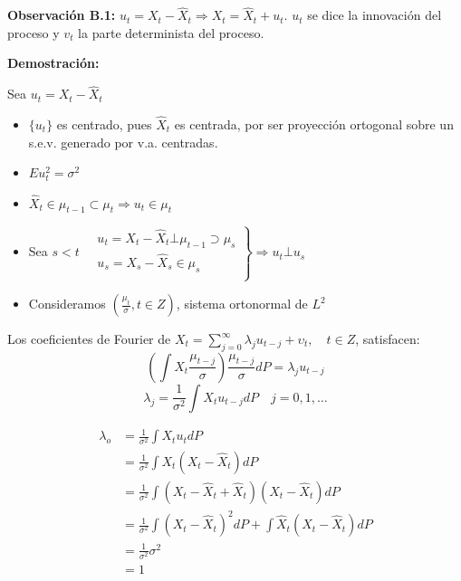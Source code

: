 \textbf{Observaci\'{o}n B.1:} $u_{t} =X_{t} -\hat{X}_{t} \Rightarrow X_{t} =\hat{X}_{t} +u_{t}$. $u_{t}$ se dice la innovaci\'{o}n del proceso y $v_{t}$ la parte determinista del proceso.\newline

\textbf{Demostraci\'{o}n: }\newline

Sea $u_{t} =X_{t} -\hat{X}_{t}$

\begin{itemize}
\item $\{u_{t} \}$ es centrado, pues $\hat{X}_{t}$ es centrada, por ser proyecci\'{o}n ortogonal sobre un s.e.v. generado por v.a. centradas.
\item $Eu_{t}^{2} =\sigma^{2}$
\item $\hat{X}_{t} \in \mu_{t-1} \subset \mu_{t} \Rightarrow u_{t} \in \mu_{t}$
\item Sea $s<t \quad \left. {\begin{array}{l}
 u_{t} =X_{t} -\hat{{X}}_{t} \bot \mu_{t-1} \supset \mu_{s} \\ 
 u_{s} =X_{s} -\hat{{X}}_{s} \in \mu_{s} \\ 
 \end{array}} \right\} \Rightarrow u_{t} \bot u_{s} $
\item Consideramos $\left(\frac{\mu_{t} }{\sigma }, t\in Z \right)$, sistema ortonormal de $L^{2}$
\end{itemize}

Los coeficientes de Fourier de $X_{t} =\sum_{j=0}^{\infty} \lambda_{j} u_{t-j} +\upsilon_{t}, \quad t\in Z$, satisfacen:
\[
\left(\int X_{t} \frac{\mu_{t-j}}{\sigma} \right)\frac{\mu_{t-j}}{\sigma}dP=\lambda_{j} u_{t-j} 
\]
\[
\lambda_{j} =\frac{1}{\sigma^{2}}\int X_{t} u_{t-j} dP\quad j=0,1,\ldots
\]

\begin{align*}
\lambda_{o} &= \frac{1}{\sigma^{2}}\int X_{t} u_{t} dP\\
            &= \frac{1}{\sigma^{2}}\int X_{t} \left(X_{t} -\hat{X}_{t}\right)dP\\
            &= \frac{1}{\sigma^{2}}\int \left(X_{t} -\hat{X}_{t} +\hat{X}_{t} \right)\left(X_{t} -\hat{X}_{t} \right)dP\\
            &= \frac{1}{\sigma^{2}}\int \left(X_{t} -\hat{X}_{t} \right)^{2}dP+\int \hat{X}_{t} \left(X_{t} -\hat{X}_{t} \right) dP\\
            &= \frac{1}{\sigma^{2}}\sigma^{2}\\
            &=1
\end{align*}

